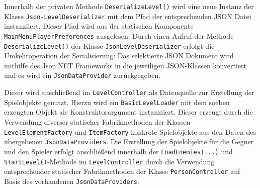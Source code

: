 Innerhalb der privaten Methode \texttt{DeserializeLevel()} wird eine neue Instanz der Klasse \texttt{Json-\linebreak LevelDeserializer} mit dem Pfad der entsprechenden JSON Datei instanziiert. Dieser Pfad wird aus der statischen Komponente \texttt{MainMenuPlayerPreferences} ausgelesen. Durch einen Aufruf der Methode \texttt{DeserializeLevel()} der Klasse \texttt{JsonLevelDeserializer} erfolgt die Umkehroperation der Serialisierung: Das selektierte JSON Dokument wird mithilfe des Json.NET Frameworks in die jeweiligen JSON-Klassen konvertiert und es wird ein \texttt{JsonDataProvider} zurückgegeben.

Dieser wird anschließend im \texttt{LevelController} als Datenquelle zur Erstellung der Spielobjekte genutzt. Hierzu wird ein \texttt{BasicLevelLoader} mit dem soeben erzeugten Objekt als Konstruktorargument instanziiert. Dieser erzeugt durch die Verwendung diverser statischer Fabrikmethoden der Klassen \texttt{LevelElementFactory} und \texttt{ItemFactory} konkrete Spielobjekte aus den Daten des übergebenen \texttt{JsonDataProviders}. Die Erstellung der Spielobjekte für die Gegner und den Spieler erfolgt anschließend innerhalb der \texttt{LoadEnemies(...)} und \texttt{StartLevel()}-Methode im \texttt{LevelController} durch die Verwendung entsprechender statischer Fabrikmethoden der Klasse \texttt{PersonController} auf Basis des vorhandenen \texttt{JsonDataProviders}.








